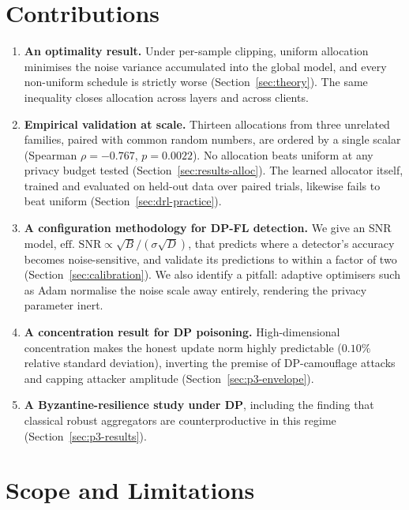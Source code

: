 \section{Contributions}

\begin{enumerate}
  \item \textbf{An optimality result.} Under per-sample clipping, uniform
  allocation minimises the noise variance accumulated into the global model, and
  every non-uniform schedule is strictly worse (Section~\ref{sec:theory}). The
  same inequality closes allocation across layers and across clients.

  \item \textbf{Empirical validation at scale.} Thirteen allocations from three
  unrelated families, paired with common random numbers, are ordered by a single
  scalar (Spearman $\rho=-0.767$, $p=0.0022$). No allocation beats uniform at
  any privacy budget tested (Section~\ref{sec:results-alloc}). The learned
  allocator itself, trained and evaluated on held-out data over paired trials,
  likewise fails to beat uniform (Section~\ref{sec:drl-practice}).

  \item \textbf{A configuration methodology for DP-FL detection.} We give an
  SNR model, $\text{eff.\ SNR}\propto \sqrt{B}/(\sigma\sqrt{D})$, that predicts
  where a detector's accuracy becomes noise-sensitive, and validate its
  predictions to within a factor of two (Section~\ref{sec:calibration}). We also
  identify a pitfall: adaptive optimisers such as Adam normalise the noise scale
  away entirely, rendering the privacy parameter inert.

  \item \textbf{A concentration result for DP poisoning.} High-dimensional
  concentration makes the honest update norm highly predictable ($0.10\%$
  relative standard deviation), inverting the premise of DP-camouflage attacks
  and capping attacker amplitude (Section~\ref{sec:p3-envelope}).

  \item \textbf{A Byzantine-resilience study under DP}, including the finding
  that classical robust aggregators are counterproductive in this regime
  (Section~\ref{sec:p3-results}).
\end{enumerate}

\section{Scope and Limitations}

